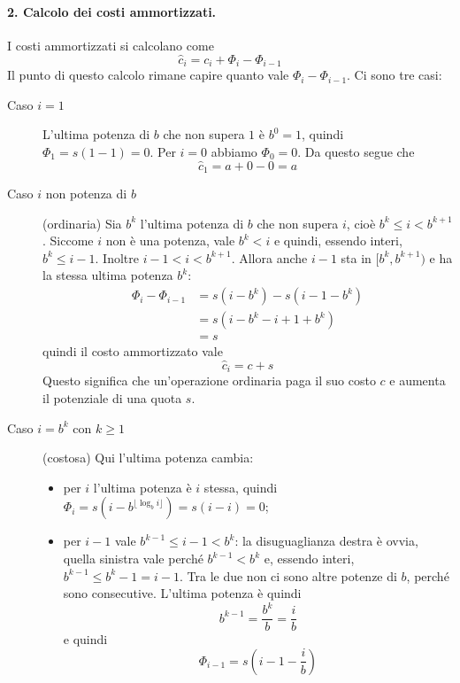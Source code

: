 \paragraph{2. Calcolo dei costi ammortizzati.}
I costi ammortizzati si calcolano come
\[
\hat{c}_i = c_i + \Phi_i - \Phi_{i-1}
\]
Il punto di questo calcolo rimane capire quanto vale $\Phi_i - \Phi_{i-1}$. Ci sono tre casi:
\begin{description}
    \item[Caso $i=1$] L'ultima potenza di $b$ che non supera $1$ è $b^0 = 1$, quindi $\Phi_1 = s(1-1) = 0$. Per $i=0$ abbiamo $\Phi_0 = 0$. Da questo segue che
    \[
    \hat{c}_1 = a + 0 - 0 = a
    \]
    \item[Caso $i$ non potenza di $b$] (ordinaria) Sia $b^k$ l'ultima potenza di $b$ che non supera $i$, cioè $b^k \le i < b^{k+1}$. Siccome $i$ non è una potenza, vale $b^k < i$ e quindi, essendo interi, $b^k \le i-1$. Inoltre $i-1 < i < b^{k+1}$. Allora anche $i-1$ sta in $[b^k, b^{k+1})$ e ha la stessa ultima potenza $b^k$:
    \begin{align*}
        \Phi_i - \Phi_{i-1} &= s(i-b^k) - s(i-1 - b^k) \\
        &= s(i-b^k - i + 1 + b^k) \\
        &= s
    \end{align*}
    quindi il costo ammortizzato vale
    \[
    \hat{c}_i = c + s
    \]
    Questo significa che un'operazione ordinaria paga il suo costo $c$ e aumenta il potenziale di una quota $s$.
    \item[Caso $i = b^k$ con $k \ge 1$] (costosa) Qui l'ultima potenza cambia:
    \begin{itemize}
        \item per $i$ l'ultima potenza è $i$ stessa, quindi $\Phi_i = s(i - b^{\lfloor \log_b i \rfloor}) = s(i - i) = 0$;
        \item per $i-1$ vale $b^{k-1} \le i-1 < b^k$: la disuguaglianza destra è ovvia, quella sinistra vale perché $b^{k-1} < b^k$ e, essendo interi, $b^{k-1} \le b^k - 1 = i-1$. Tra le due non ci sono altre potenze di $b$, perché sono consecutive. L'ultima potenza è quindi
        \[
        b^{k-1} = \frac{b^k}{b} = \frac{i}{b}
        \]
        e quindi
        \[
            \Phi_{i-1} = s\left(i-1 - \frac{i}{b}\right)
        \]
    \end{itemize}


\end{description}
